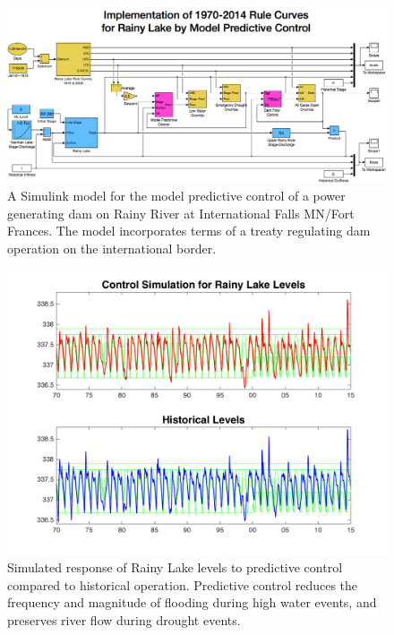 \documentclass[preprint,times]{elsarticle}
\begin{document}
\begin{figure}
\includegraphics[width=\linewidth]{RLSim_Model}
\caption{A Simulink model for the model predictive control of a power generating dam on Rainy River at International Falls MN/Fort Frances. The model incorporates terms of a treaty regulating dam operation on the international border.}\label{figure:10}
\end{figure}

\begin{figure}
\includegraphics[width=\linewidth]{RLSim_Results}
\caption{Simulated response of Rainy Lake levels to predictive control compared to historical operation. Predictive control reduces the frequency and magnitude of flooding during high water events, and preserves river flow during drought events.}\label{figure:RLSimResults}
\end{figure}
\end{document}
